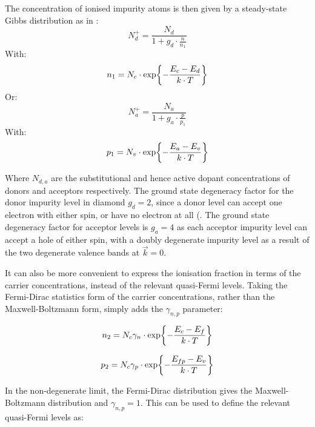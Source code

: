 The concentration of ionised impurity atoms is then given by a steady-state Gibbs distribution as in \cite{tcadmanual2001}:
\begin{equation}
    N^{+}_{d} = \frac{N_{d}}{1+g_{d}\cdot\frac{n}{n_{1}}}
    \label{eq:incomplete_ionisation_donors}
\end{equation}
With: 
\begin{equation}
    n_{1}=N_{c}\cdot\exp{-\frac{E_{c}-E_{d}}{k\cdot T}}
    \label{eq:n_{1}_gibbs_distribution}
\end{equation}
Or:
\begin{equation}
    N^{+}_{a} = \frac{N_{a}}{1+g_{a}\cdot\frac{p}{p_{1}}}
    \label{eq:incomplete_ionisation_acceptors}
\end{equation}
With:
\begin{equation}
    p_{1}=N_{v}\cdot\exp{-\frac{E_{a}-E_{v}}{k\cdot T}}
    \label{eq:p_{1}_gibbs_distribution}
\end{equation}

Where $N_{d,a}$ are the substitutional and hence active dopant concentrations of donors and acceptors respectively. The ground state degeneracy factor for the donor impurity level in diamond $g_{d} = 2$, since a donor level can accept one electron with either spin, or have no electron at all  (\cite{koizumi2018:ch2}. The ground state degeneracy factor for acceptor levels is $g_{a}=4$ as each acceptor impurity level can accept a hole of either spin, with a doubly degenerate impurity level as a result of the two degenerate valence bands at $\Vec{k}=0$.

It can also be more convenient to express the ionisation fraction in terms of the carrier concentrations, instead of the relevant quasi-Fermi levels. Taking the Fermi-Dirac statistics form of the carrier concentrations, rather than the Maxwell-Boltzmann form, simply adds the $\gamma_{n,p}$ parameter:

\begin{equation}
    n_{2}=N_{c}\gamma_{n}\cdot\exp{-\frac{E_{c}-E_{f}}{k\cdot T}}
    \label{eq:n_{2}_fermi_distribution}
\end{equation}

\begin{equation}
    p_{2}=N_{c}\gamma_{p}\cdot\exp{-\frac{E_{fp}-E_{v}}{k\cdot T}}
    \label{eq:p_{2}__fermi_distribution}
\end{equation}

In the non-degenerate limit, the Fermi-Dirac distribution gives the Maxwell-Boltzmann distribution and $\gamma_{n,p}=1$. This can be used to define the relevant quasi-Fermi levels as:


